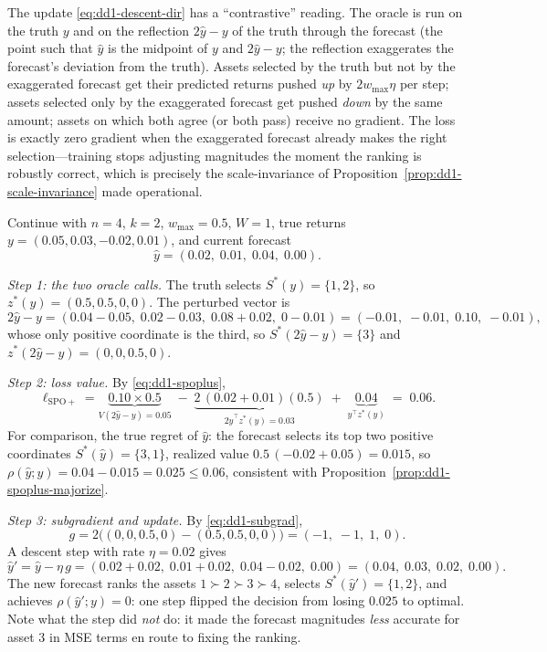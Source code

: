 \begin{intuition}
The update \eqref{eq:dd1-descent-dir} has a ``contrastive'' reading. The
oracle is run on the truth $y$ and on the reflection $2\hat{y} - y$ of the
truth through the forecast (the point such that $\hat{y}$ is the midpoint of
$y$ and $2\hat{y} - y$; the reflection exaggerates the forecast's deviation
from the truth). Assets selected by the truth but not by the exaggerated
forecast get their predicted returns pushed \emph{up} by $2 w_{\max} \eta$ per
step; assets selected only by the exaggerated forecast get pushed \emph{down}
by the same amount; assets on which both agree (or both pass) receive no
gradient. The loss is exactly zero gradient when the exaggerated forecast
already makes the right selection---training stops adjusting magnitudes the
moment the ranking is robustly correct, which is precisely the
scale-invariance of Proposition~\ref{prop:dd1-scale-invariance} made
operational.
\end{intuition}

\begin{example}
\label{ex:dd1-spoplus-step}
Continue with $n = 4$, $k = 2$, $w_{\max} = 0.5$, $W = 1$, true returns
$y = (0.05, 0.03, -0.02, 0.01)$, and current forecast
\[
\hat{y} = (0.02,\; 0.01,\; 0.04,\; 0.00).
\]

\emph{Step 1: the two oracle calls.} The truth selects
$S^*(y) = \{1, 2\}$, so $z^*(y) = (0.5, 0.5, 0, 0)$. The perturbed vector is
\[
2\hat{y} - y = (0.04 - 0.05,\; 0.02 - 0.03,\; 0.08 + 0.02,\; 0 - 0.01)
= (-0.01,\; -0.01,\; 0.10,\; -0.01),
\]
whose only positive coordinate is the third, so
$S^*(2\hat{y} - y) = \{3\}$ and $z^*(2\hat{y} - y) = (0, 0, 0.5, 0)$.

\emph{Step 2: loss value.} By \eqref{eq:dd1-spoplus},
\[
\ell_{\mathrm{SPO+}} = \underbrace{0.10 \times 0.5}_{V(2\hat y - y) = 0.05}
\;-\; \underbrace{2\,(0.02 + 0.01)(0.5)}_{2\hat{y}^\top z^*(y) = 0.03}
\;+\; \underbrace{0.04}_{y^\top z^*(y)} \;=\; 0.06 .
\]
For comparison, the true regret of $\hat{y}$: the forecast selects its top
two positive coordinates $S^*(\hat{y}) = \{3, 1\}$, realized value
$0.5\,(-0.02 + 0.05) = 0.015$, so
$\rho(\hat{y}; y) = 0.04 - 0.015 = 0.025 \le 0.06$, consistent with
Proposition~\ref{prop:dd1-spoplus-majorize}.

\emph{Step 3: subgradient and update.} By \eqref{eq:dd1-subgrad},
\[
g = 2\bigl( (0, 0, 0.5, 0) - (0.5, 0.5, 0, 0) \bigr)
= (-1,\; -1,\; 1,\; 0).
\]
A descent step with rate $\eta = 0.02$ gives
\[
\hat{y}' = \hat{y} - \eta\, g
= (0.02 + 0.02,\; 0.01 + 0.02,\; 0.04 - 0.02,\; 0.00)
= (0.04,\; 0.03,\; 0.02,\; 0.00).
\]
The new forecast ranks the assets $1 \succ 2 \succ 3 \succ 4$, selects
$S^*(\hat{y}') = \{1, 2\}$, and achieves $\rho(\hat{y}'; y) = 0$: one step
flipped the decision from losing $0.025$ to optimal. Note what the step did
\emph{not} do: it made the forecast magnitudes \emph{less} accurate for asset
$3$ in MSE terms en route to fixing the ranking.
\end{example}

